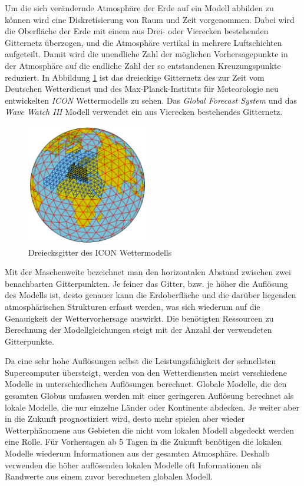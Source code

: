 Um die sich verändernde Atmosphäre der Erde auf ein Modell abbilden zu
können wird eine Diskretisierung von Raum und Zeit vorgenommen. Dabei
wird die Oberfläche der Erde mit einem aus Drei- oder Vierecken
bestehenden Gitternetz überzogen, und die Atmosphäre vertikal in
mehrere Luftschichten aufgeteilt. Damit wird die unendliche Zahl der
möglichen Vorhersagepunkte in der Atmosphäre auf die endliche Zahl der
so entstandenen Kreuzungspunkte reduziert. In Abbildung
\ref{gitternetz} ist das dreieckige Gitternetz des zur Zeit vom
Deutschen Wetterdienst und des Max-Planck-Instituts für Meteorologie
neu entwickelten \textit{ICON}  Wettermodells zu
sehen. Das \textit{Global Forecast System} und das \textit{Wave Watch
  III} Modell verwendet ein aus Vierecken bestehendes Gitternetz.

\begin{figure}[h]
  \begin{center}
    \includegraphics[height=200px]{bilder/gitternetz}
    \caption{Dreiecksgitter des ICON Wettermodells}
    \label{gitternetz}
  \end{center}
\end{figure}

Mit der Maschenweite bezeichnet man den horizontalen Abstand zwischen
zwei benachbarten Gitterpunkten. Je feiner das Gitter, bzw. je höher
die Auflösung des Modells ist, desto genauer kann die Erdoberfläche
und die darüber liegenden atmosphärischen Strukturen erfasst werden,
was sich wiederum auf die Genauigkeit der Wettervorhersage
auswirkt. Die benötigten Ressourcen zu Berechnung der
Modellgleichungen steigt mit der Anzahl der verwendeten Gitterpunkte.

Da eine sehr hohe Auflösungen selbst die Leistungsfähigkeit der
schnellsten Supercomputer übersteigt, werden von den Wetterdiensten
meist verschiedene Modelle in unterschiedlichen Auflösungen
berechnet. Globale Modelle, die den gesamten Globus umfassen werden
mit einer geringeren Auflösung berechnet als lokale Modelle, die nur
einzelne Länder oder Kontinente abdecken. Je weiter aber in die
Zukunft prognostiziert wird, desto mehr spielen aber wieder
Wetterphänomene aus Gebieten die nicht vom lokalen Modell abgedeckt
werden eine Rolle. Für Vorhersagen ab 5 Tagen in die Zukunft benötigen
die lokalen Modelle wiederum Informationen aus der gesamten
Atmosphäre. Deshalb verwenden die höher auflösenden lokalen Modelle
oft Informationen als Randwerte aus einem zuvor berechneten globalen
Modell.

